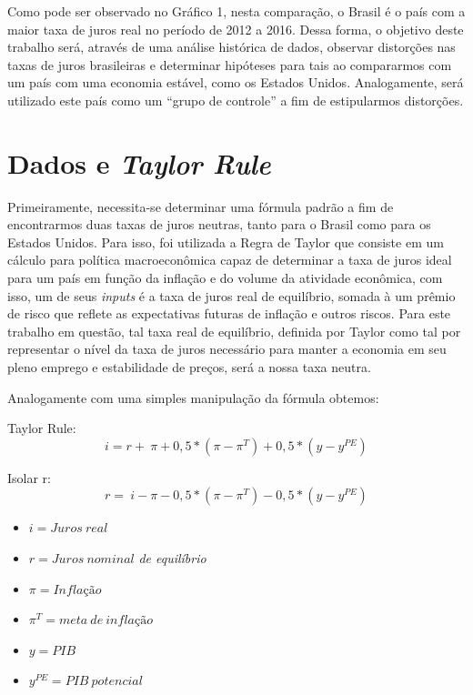  Como pode ser observado no Gr\'{a}fico 1, nesta compara\c{c}\~{a}o, o Brasil \'{e} o pa\'{i}s com a maior taxa de juros real no per\'{i}odo de 2012 a 2016. Dessa forma, o objetivo deste trabalho ser\'{a}, atrav\'{e}s de uma an\'{a}lise hist\'{o}rica de dados, observar distor\c{c}\~{o}es nas taxas de juros brasileiras e determinar hip\'{o}teses para tais ao compararmos com um pa\'{i}s com uma economia est\'{a}vel, como os Estados Unidos. Analogamente, ser\'{a} utilizado este pa\'{i}s como um ``grupo de controle'' a fim de estipularmos distor\c{c}\~{o}es. 

\section*{Dados e \textit{Taylor Rule} }

 Primeiramente, necessita-se determinar uma f\'{o}rmula padr\~{a}o a fim de encontrarmos duas taxas de juros neutras, tanto para o Brasil como para os Estados Unidos. Para isso, foi utilizada a Regra de Taylor que consiste em um c\'{a}lculo para pol\'{i}tica macroecon\^{o}mica capaz de determinar a taxa de juros ideal para um pa\'{i}s em fun\c{c}\~{a}o da infla\c{c}\~{a}o e do volume da atividade econ\^{o}mica, com isso, um de seus \textit{inputs} \'{e} a taxa de juros real de equil\'{i}brio, somada \`{a} um pr\^{e}mio de risco que reflete as expectativas futuras de infla\c{c}\~{a}o e outros riscos. Para este trabalho em quest\~{a}o, tal taxa real de equil\'{i}brio, definida por Taylor como tal por representar o n\'{i}vel da taxa de juros necess\'{a}rio para manter a economia em seu pleno emprego e estabilidade de pre\c{c}os, ser\'{a} a nossa taxa neutra. 

 Analogamente com uma simples manipula\c{c}\~{a}o da f\'{o}rmula obtemos: 

Taylor Rule: 
\[i=r+~\pi +0,5*\left(\pi -{\pi }^T\right)+0,5*\left(y-y^{PE}\right)\] 

Isolar r: 
\[r=~i-\pi -0,5*\left(\pi -{\pi }^T\right)-0,5*\left(y-y^{PE}\right)\] 


\begin{itemize}
\item  $i=Juros~real$

\item  $r=Juros~nominal$\textit{ de equil\'{i}brio }

\item  $\pi =Infla\textrm{\c{c}}\textrm{\~{a}}o$

\item  ${\pi }^T=meta~de~infla\textrm{\c{c}}\textrm{\~{a}}o~$

\item  $y=PIB$

\item  $y^{PE}=PIB~potencial$
\end{itemize}

